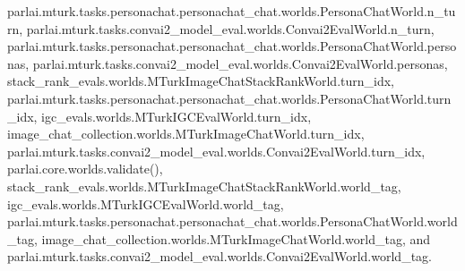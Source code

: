 parlai.\+mturk.\+tasks.\+personachat.\+personachat\+\_\+chat.\+worlds.\+Persona\+Chat\+World.\+n\+\_\+turn, parlai.\+mturk.\+tasks.\+convai2\+\_\+model\+\_\+eval.\+worlds.\+Convai2\+Eval\+World.\+n\+\_\+turn, parlai.\+mturk.\+tasks.\+personachat.\+personachat\+\_\+chat.\+worlds.\+Persona\+Chat\+World.\+personas, parlai.\+mturk.\+tasks.\+convai2\+\_\+model\+\_\+eval.\+worlds.\+Convai2\+Eval\+World.\+personas, stack\+\_\+rank\+\_\+evals.\+worlds.\+M\+Turk\+Image\+Chat\+Stack\+Rank\+World.\+turn\+\_\+idx, parlai.\+mturk.\+tasks.\+personachat.\+personachat\+\_\+chat.\+worlds.\+Persona\+Chat\+World.\+turn\+\_\+idx, igc\+\_\+evals.\+worlds.\+M\+Turk\+I\+G\+C\+Eval\+World.\+turn\+\_\+idx, image\+\_\+chat\+\_\+collection.\+worlds.\+M\+Turk\+Image\+Chat\+World.\+turn\+\_\+idx, parlai.\+mturk.\+tasks.\+convai2\+\_\+model\+\_\+eval.\+worlds.\+Convai2\+Eval\+World.\+turn\+\_\+idx, parlai.\+core.\+worlds.\+validate(), stack\+\_\+rank\+\_\+evals.\+worlds.\+M\+Turk\+Image\+Chat\+Stack\+Rank\+World.\+world\+\_\+tag, igc\+\_\+evals.\+worlds.\+M\+Turk\+I\+G\+C\+Eval\+World.\+world\+\_\+tag, parlai.\+mturk.\+tasks.\+personachat.\+personachat\+\_\+chat.\+worlds.\+Persona\+Chat\+World.\+world\+\_\+tag, image\+\_\+chat\+\_\+collection.\+worlds.\+M\+Turk\+Image\+Chat\+World.\+world\+\_\+tag, and parlai.\+mturk.\+tasks.\+convai2\+\_\+model\+\_\+eval.\+worlds.\+Convai2\+Eval\+World.\+world\+\_\+tag.

